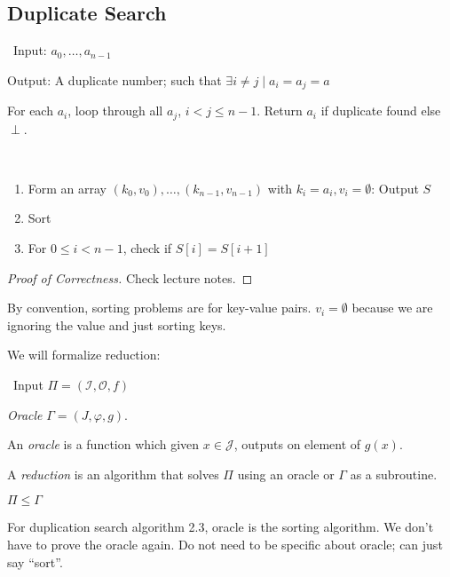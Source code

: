 \documentclass[11pt]{scrartcl}
\theoremstyle{dotlessP}
\theoremstyle{dotlessN}
\begin{document}
\subsection{Duplicate Search}
\begin{problem}
	\
	Input: $a_0, \dots, a_{n-1}$ 

	Output: A duplicate number; such that $\exists i \neq j \mid a_i = a_j = a$
\end{problem}
\begin{algorithm}
	For each $a_i$, loop through all  $a_j$, $i<j\leq n-1$. Return  $a_i$ if duplicate found else  $\perp$.
\end{algorithm}
\begin{algorithm}
	\
	\begin{enumerate}
	\item Form an array $(k_0, v_0), \dots, (k_{n-1}, v_{n-1})$ with $k_i = a_i, v_i = \emptyset$: Output  $S$
	\item Sort
	\item For $0 \leq i < n - 1$, check if  $S[i] = S[i+1]$
	\end{enumerate}
\end{algorithm}
\begin{proof}
	[Proof of Correctness]
	Check lecture notes.
\end{proof}
\begin{remark}
	By convention, sorting problems are for key-value pairs. $v_i = \emptyset$ because we are ignoring the value and just sorting keys.
\end{remark}
We will formalize reduction:
\begin{definition}
	\
	Input $\Pi = (\mathcal{I}, \mathcal{O}, f)$ 

	\textit{Oracle}  $\Gamma = (J, \varphi, g)$. 
\end{definition}
\begin{definition}
	[Oracle]
	An \textit{oracle} is a function which given $x \in \mathcal{J}$, outputs on element of $g(x)$.
\end{definition}
\begin{definition}
	[Reduction]
A \textit{reduction} is an algorithm that solves $\Pi$ using an oracle or $\Gamma$ as a subroutine.
\end{definition}
\begin{remark}
	$\Pi \leq \Gamma$	
\end{remark}
\begin{remark}
	For duplication search algorithm 2.3, oracle is the sorting algorithm. We don't have to prove the oracle again. Do not need to be specific about oracle; can just say ``sort''.
\end{remark}
\end{document}
